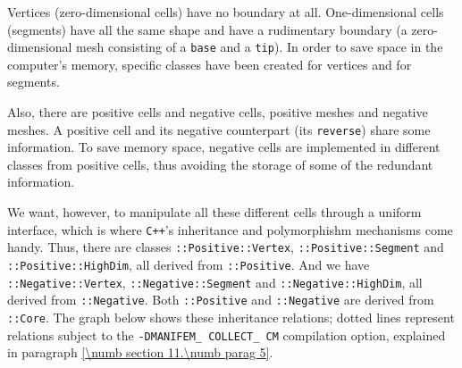 Vertices (zero-dimensional cells) have no boundary at all.
One-dimensional cells (segments) have all the same shape and have a rudimentary boundary
(a zero-dimensional mesh consisting of a {\small\tt base} and a {\small\tt tip}).
In order to save space in the computer's memory, specific classes have been created for
vertices and for segments.

Also, there are positive cells and negative cells, positive meshes and negative meshes.
A positive cell and its negative counterpart (its {\small\tt reverse}) share some information.
To save memory space, negative cells are implemented in different classes from
positive cells, thus avoiding the storage of some of the redundant information.

We want, however, to manipulate all these different cells through a uniform interface,
which is where {\tt C++}'s inheritance and polymorphishm mechanisms come handy.
Thus, there are classes {\small\tt{}::Positive::Vertex},
{\small\tt{}::Positive::Segment} and {\small\tt{}::Positive::HighDim},
all derived from {\small\tt{}::Positive}.
And we have {\small\tt{}::Negative::Vertex},
{\small\tt{}::Negative::Segment} and {\small\tt{}::Negative::HighDim},
all derived from {\small\tt{}::Negative}.
Both {\small\tt{}::Positive} and {\small\tt{}::Negative} are derived from
{\small\tt{}::Core}.
The graph below shows these inheritance relations; dotted lines represent relations subject to
the {\small\tt -DMANIFEM\_\,COLLECT\_\,CM} compilation option, explained in paragraph
\ref{\numb section 11.\numb parag 5}.

